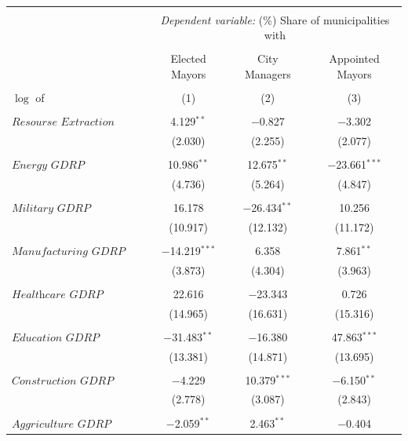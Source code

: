 \documentclass[12pt]{article}
\numberwithin{equation}{section}
\numberwithin{table}{section}
\numberwithin{figure}{section}
\begin{document}
\begin{table}[!htbp] \centering \footnotesize
\begin{threeparttable}
    \caption{} 
    \label{} 
  \begin{tabular}{@{\extracolsep{5pt}}lccc} 
  \\[-1.8ex]\hline 
  \hline \\[-1.8ex] 
   & \multicolumn{3}{c}{\textit{Dependent variable:}  (\%) Share of municipalities with} \\ 
  \cline{2-4} 
  \\[-1.8ex] & Elected Mayors & City Managers & Appointed Mayors\\ 
  \\[-1.8ex] $\log$ of& (1) & (2) & (3)\\ 
  \hline \\[-1.8ex]
  $\textit{Resourse Extraction GRDP}$ & 4.129$^{**}$ & $-$0.827 & $-$3.302 \\ 
  & (2.030) & (2.255) & (2.077) \\ 
  & & & \\ 
  $\textit{Energy GDRP}$ & 10.986$^{**}$ & 12.675$^{**}$ & $-$23.661$^{***}$ \\ 
  & (4.736) & (5.264) & (4.847) \\ 
  & & & \\ 
 $\textit{Military GDRP}$ & 16.178 & $-$26.434$^{**}$ & 10.256 \\ 
  & (10.917) & (12.132) & (11.172) \\ 
  & & & \\ 
 $\textit{Manufacturing GDRP}$ & $-$14.219$^{***}$ & 6.358 & 7.861$^{**}$ \\ 
  & (3.873) & (4.304) & (3.963) \\ 
  & & & \\ 
 $\textit{Healthcare GDRP}$ & 22.616 & $-$23.343 & 0.726 \\ 
  & (14.965) & (16.631) & (15.316) \\ 
  & & & \\ 
 $\textit{Education GDRP}$ & $-$31.483$^{**}$ & $-$16.380 & 47.863$^{***}$ \\ 
  & (13.381) & (14.871) & (13.695) \\ 
  & & & \\ 
 $\textit{Construction GDRP}$ & $-$4.229 & 10.379$^{***}$ & $-$6.150$^{**}$ \\ 
  & (2.778) & (3.087) & (2.843) \\ 
  & & & \\ 
 $\textit{Aggriculture GDRP}$ & $-$2.059$^{**}$ & 2.463$^{**}$ & $-$0.404 \\ 

\end{tabular}
\end{threeparttable}
\end{table}
\end{document}

